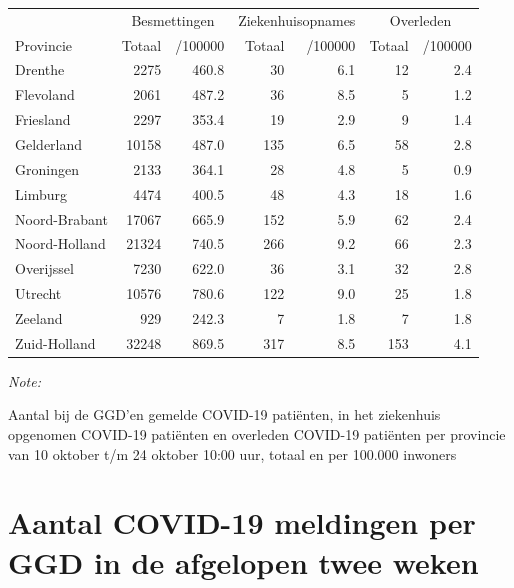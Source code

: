 \documentclass[
  english,
  man,floatsintext]{apa6}
\begin{document}
\begin{table}[H]
\centering
\begin{threeparttable}
\begin{tabular}{lrrrrrr}
\toprule
\multicolumn{1}{c}{ } & \multicolumn{2}{c}{Besmettingen} & \multicolumn{2}{c}{Ziekenhuisopnames} & \multicolumn{2}{c}{Overleden} \\
\cmidrule(l{3pt}r{3pt}){2-3} \cmidrule(l{3pt}r{3pt}){4-5} \cmidrule(l{3pt}r{3pt}){6-7}
Provincie & Totaal & /100000 & Totaal & /100000 & Totaal & /100000\\
\midrule
Drenthe & 2275 & 460.8 & 30 & 6.1 & 12 & 2.4\\
Flevoland & 2061 & 487.2 & 36 & 8.5 & 5 & 1.2\\
Friesland & 2297 & 353.4 & 19 & 2.9 & 9 & 1.4\\
Gelderland & 10158 & 487.0 & 135 & 6.5 & 58 & 2.8\\
Groningen & 2133 & 364.1 & 28 & 4.8 & 5 & 0.9\\
Limburg & 4474 & 400.5 & 48 & 4.3 & 18 & 1.6\\
Noord-Brabant & 17067 & 665.9 & 152 & 5.9 & 62 & 2.4\\
Noord-Holland & 21324 & 740.5 & 266 & 9.2 & 66 & 2.3\\
Overijssel & 7230 & 622.0 & 36 & 3.1 & 32 & 2.8\\
Utrecht & 10576 & 780.6 & 122 & 9.0 & 25 & 1.8\\
Zeeland & 929 & 242.3 & 7 & 1.8 & 7 & 1.8\\
Zuid-Holland & 32248 & 869.5 & 317 & 8.5 & 153 & 4.1\\
\bottomrule
\end{tabular}
\begin{tablenotes}
\item \textit{Note: } 
\item Aantal bij de GGD’en gemelde COVID-19 patiënten, in het ziekenhuis opgenomen COVID-19 patiënten en overleden COVID-19 patiënten per provincie van 10 oktober t/m 24 oktober 10:00 uur, totaal en per 100.000 inwoners
\end{tablenotes}
\end{threeparttable}
\end{table}

\newpage

\hypertarget{aantal-covid-19-meldingen-per-ggd-in-de-afgelopen-twee-weken}{%
\section{Aantal COVID-19 meldingen per GGD in de afgelopen twee weken}\label{aantal-covid-19-meldingen-per-ggd-in-de-afgelopen-twee-weken}}
\end{document}
